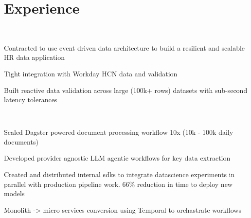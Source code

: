 \documentclass[a4paper]{deedy-resume-openfont} %
\begin{document}
\begin{minipage}[t]{0.66\textwidth} %


\section{Experience}

\\

\vspace{\topsep}
\begin{tightitemize}
    \item Contracted to use event driven data architecture to build a resilient and scalable HR data application
    \item Tight integration with Workday HCN data and validation
    \item Built reactive data validation across large (100k+ rows) datasets with sub-second latency tolerances
\end{tightitemize}
\vspace{\topsep}

\\

\begin{tightitemize}
    \item Scaled Dagster powered document processing workflow 10x (10k - 100k daily documents) 
    \item Developed provider agnostic LLM agentic workflows for key data extraction
    \item Created and distributed internal sdks to integrate datascience experiments in parallel with production pipeline work. 66\% reduction in time to deploy new models
    \item Monolith -> micro services conversion using Temporal to orchastrate workflows
\end{tightitemize}
\vspace{\topsep}

\\


\end{minipage}
\end{document}
